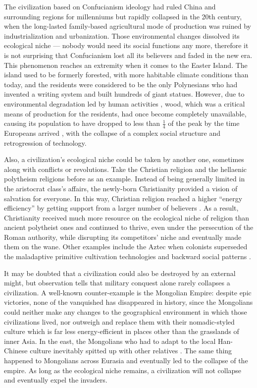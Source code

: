 \documentclass[a4paper,12pt]{article}
\begin{document}
    The civilization based on Confucianism ideology had ruled China and surrounding regions for millenniums but rapidly collapsed in the 20th century, when the long-lasted family-based agricultural mode of production was ruined by industrialization and urbanization.
    Those environmental changes dissolved its ecological niche --- nobody would need its social functions any more, therefore it is not surprising that Confucianism lost all its believers and faded in the new era.
    This phenomenon reaches an extremity when it comes to the Easter Island.
    The island used to be formerly forested, with more habitable climate conditions than today, and the residents were considered to be the only Polynesians who had invented a writing system and built hundreds of giant statues.
    However, due to environmental degradation led by human activities \cite{1991_ClimaticEasterIsland}, wood, which was a critical means of production for the residents, had once become completely unavailable, causing its population to have dropped to less than $\frac 1 4$ of the peak by the time Europeans arrived \cite{2005_TheRapeOfRapaNui}, with the collapse of a complex social structure and retrogression of technology.
    
    Also, a civilization's ecological niche could be taken by another one, sometimes along with conflicts or revolutions.
    Take the Christian religion and the hellaenic polytheism religions before as an example.
    Instead of being generally limited in the aristocrat class's affairs, the newly-born Christianity provided a vision of salvation for everyone.
    In this way, Christian religion reached a higher ``energy efficiency'' by getting support from a larger number of believers \cite{2018_ChristianCareForPoor}.
    As a result, Christianity received much more resource on the ecological niche of religion than ancient polytheist ones and continued to thrive, even under the persecution of the Roman authority, while disrupting its competitors' niche and eventually made them on the wane.
    Other examples include the Aztec when colonists superseded the maladaptive primitive cultivation technologies and backward social patterns \cite{2016_WhyCivFail}.
    
    It may be doubted that a civilization could also be destroyed by an external might, but observation tells that military conquest alone rarely collapses a civilization.
    A well-known counter-example is the Mongolian Empire: despite epic victories, none of the vanquished has disappeared in history, since the Mongolians could neither make any changes to the geographical environment in which those civilizations lived, nor outweigh and replace them with their nomadic-styled culture which is far less energy-efficient in places other than the grasslands of inner Asia.
    In the east, the Mongolians who had to adapt to the local Han-Chinese culture inevitably spitted up with other relatives \cite{2002_MongolCulture}. 
    The same thing happened to Mongolians across Eurasia and eventually led to the collapse of the empire.
    As long as the ecological niche remains, a civilization will not collapse and eventually expel the invaders. 
    
\end{document}
